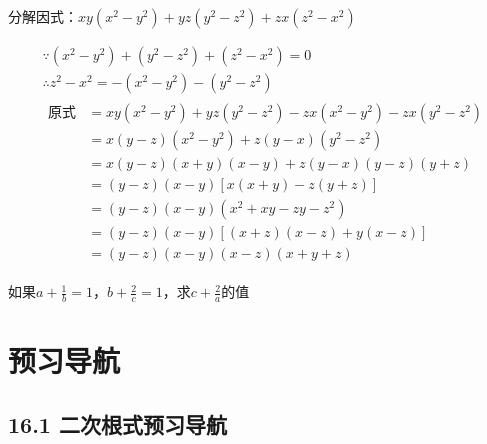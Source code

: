 \documentclass[answers]{exam} %
\begin{document}
\begin{questions}
\question
  分解因式：$xy(x^2-y^2) + yz(y^2 - z^2) + zx(z^2 - x^2)$

  \vspace*{1in}
  \begin{solution}
    \[
      \begin{aligned}
        & \because (x^2 - y^2) + (y^2 - z^2) + (z^2 - x^2) = 0 \\
        & \therefore z^2 - x^2 = - (x^2 - y^2) - (y^2 - z^2) \\
        & \begin{aligned}
          \mbox{原式} &= xy(x^2 - y^2) + yz(y^2 - z^2) - zx(x^2 - y^2) - zx(y^2 - z^2) \\
          &= x(y - z)(x^2 - y^2) + z(y - x)(y^2 - z^2) \\
          &= x(y - z)(x + y)(x - y) + z(y - x)(y - z)(y + z) \\
          &= (y - z)(x - y)[x(x + y) - z(y + z)] \\
          &= (y - z)(x - y)(x^2 + xy - zy - z^2) \\
          &= (y - z)(x - y)[(x + z)(x - z) + y(x - z)] \\
          &= (y - z)(x - y)(x - z)(x + y + z)
        \end{aligned}
      \end{aligned}
    \]
  \end{solution}

\question
  如果$a+\frac{1}{b}=1$，$b+\frac{2}{c}=1$，求$c+\frac{2}{a}$的值

\end{questions}

\section{预习导航}

\subsection{16.1 二次根式预习导航}
\end{document}
